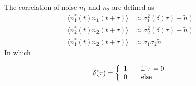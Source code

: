 \documentclass[draftcls,onecolumn]{IEEEtran}  %
\begin{document}
The correlation of noise $n_1$ and $n_2$ are defined as
\begin{equation}
\begin{split}
	\langle n_1^*(t)n_1(t +\tau)\rangle &\approx \sigma^2_1 (\delta(\tau) +\tilde{n})\\
    \langle n_2^*(t)n_2(t +\tau)\rangle &\approx \sigma^2_2 (\delta(\tau) +\tilde{n})\\
    \langle n_1^*(t)n_2(t +\tau)\rangle &\approx \sigma_1 \sigma_2 \tilde{n}
 \end{split}
\end{equation}
In which
	
\[ \delta(\tau) = \left\{ 
  \begin{array}{l l}
    1 & \quad \text{if $\tau=0$}\\
    0 & \quad \text{else}
  \end{array} \right.\]
\end{document}
